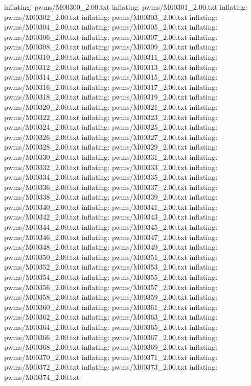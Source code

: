 \documentclass[letterpaper,10pt,english]{sphinxmanual}
\begin{document}
{\begin{sphinxVerbatim}[commandchars=\\\{\}]
  inflating: pwms/M00300\_2.00.txt
  inflating: pwms/M00301\_2.00.txt
  inflating: pwms/M00302\_2.00.txt
  inflating: pwms/M00303\_2.00.txt
  inflating: pwms/M00304\_2.00.txt
  inflating: pwms/M00305\_2.00.txt
  inflating: pwms/M00306\_2.00.txt
  inflating: pwms/M00307\_2.00.txt
  inflating: pwms/M00308\_2.00.txt
  inflating: pwms/M00309\_2.00.txt
  inflating: pwms/M00310\_2.00.txt
  inflating: pwms/M00311\_2.00.txt
  inflating: pwms/M00312\_2.00.txt
  inflating: pwms/M00313\_2.00.txt
  inflating: pwms/M00314\_2.00.txt
  inflating: pwms/M00315\_2.00.txt
  inflating: pwms/M00316\_2.00.txt
  inflating: pwms/M00317\_2.00.txt
  inflating: pwms/M00318\_2.00.txt
  inflating: pwms/M00319\_2.00.txt
  inflating: pwms/M00320\_2.00.txt
  inflating: pwms/M00321\_2.00.txt
  inflating: pwms/M00322\_2.00.txt
  inflating: pwms/M00323\_2.00.txt
  inflating: pwms/M00324\_2.00.txt
  inflating: pwms/M00325\_2.00.txt
  inflating: pwms/M00326\_2.00.txt
  inflating: pwms/M00327\_2.00.txt
  inflating: pwms/M00328\_2.00.txt
  inflating: pwms/M00329\_2.00.txt
  inflating: pwms/M00330\_2.00.txt
  inflating: pwms/M00331\_2.00.txt
  inflating: pwms/M00332\_2.00.txt
  inflating: pwms/M00333\_2.00.txt
  inflating: pwms/M00334\_2.00.txt
  inflating: pwms/M00335\_2.00.txt
  inflating: pwms/M00336\_2.00.txt
  inflating: pwms/M00337\_2.00.txt
  inflating: pwms/M00338\_2.00.txt
  inflating: pwms/M00339\_2.00.txt
  inflating: pwms/M00340\_2.00.txt
  inflating: pwms/M00341\_2.00.txt
  inflating: pwms/M00342\_2.00.txt
  inflating: pwms/M00343\_2.00.txt
  inflating: pwms/M00344\_2.00.txt
  inflating: pwms/M00345\_2.00.txt
  inflating: pwms/M00346\_2.00.txt
  inflating: pwms/M00347\_2.00.txt
  inflating: pwms/M00348\_2.00.txt
  inflating: pwms/M00349\_2.00.txt
  inflating: pwms/M00350\_2.00.txt
  inflating: pwms/M00351\_2.00.txt
  inflating: pwms/M00352\_2.00.txt
  inflating: pwms/M00353\_2.00.txt
  inflating: pwms/M00354\_2.00.txt
  inflating: pwms/M00355\_2.00.txt
  inflating: pwms/M00356\_2.00.txt
  inflating: pwms/M00357\_2.00.txt
  inflating: pwms/M00358\_2.00.txt
  inflating: pwms/M00359\_2.00.txt
  inflating: pwms/M00360\_2.00.txt
  inflating: pwms/M00361\_2.00.txt
  inflating: pwms/M00362\_2.00.txt
  inflating: pwms/M00363\_2.00.txt
  inflating: pwms/M00364\_2.00.txt
  inflating: pwms/M00365\_2.00.txt
  inflating: pwms/M00366\_2.00.txt
  inflating: pwms/M00367\_2.00.txt
  inflating: pwms/M00368\_2.00.txt
  inflating: pwms/M00369\_2.00.txt
  inflating: pwms/M00370\_2.00.txt
  inflating: pwms/M00371\_2.00.txt
  inflating: pwms/M00372\_2.00.txt
  inflating: pwms/M00373\_2.00.txt
  inflating: pwms/M00374\_2.00.txt

\end{sphinxVerbatim}}
\end{document}
